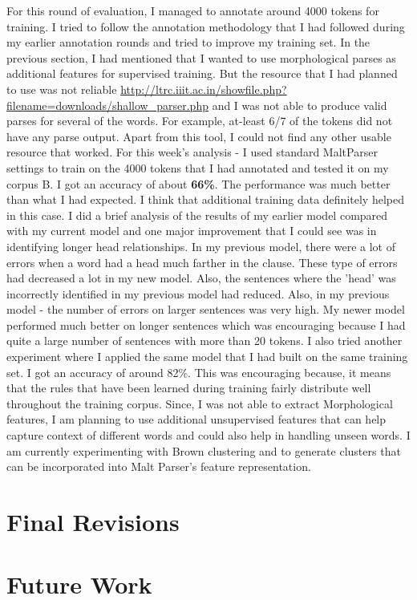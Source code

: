 \documentclass[11pt,letterpaper]{article}
\begin{document}
For this round of evaluation, I managed to annotate around 4000 tokens for training. I tried to follow the annotation methodology that I had followed during 
my earlier annotation rounds and tried to improve my training set. In the previous section, I had mentioned that I wanted to use morphological parses as additional features
for supervised training. But the resource that I had planned to use was not reliable \url{http://ltrc.iiit.ac.in/showfile.php?filename=downloads/shallow_parser.php} and I was not able to produce 
valid parses for several of the words. For example, at-least 6/7 of the tokens did not have any parse output. Apart from this tool, I could not find any other usable resource that worked.
For this week's analysis - I used standard MaltParser settings to train on the 4000 tokens that I had annotated and tested it on my corpus B. I got an
accuracy of about \textbf{66\%}. The performance was much better than what I had expected. I think that additional training data definitely helped in this case. I
did a brief analysis of the results of my earlier model compared with my current model and one major improvement that I could see was in identifying longer head relationships.
In my previous model, there were a lot of errors when a word had a head much farther in the clause. These type of errors had decreased a lot in my new model. 
Also, the sentences where the 'head' was incorrectly identified in my previous model had reduced. Also, in my previous model - the number of errors on larger sentences
was very high. My newer model performed much better on longer sentences which was encouraging because I had quite a large number of sentences with more than 20 tokens.
I also tried another experiment where I applied the same model that I had built on the same training set. I got an accuracy of around 82\%. This was encouraging because, it means that
the rules that have been learned during training fairly distribute well throughout the training corpus. Since, I was not able to extract Morphological features,
I am planning to use additional unsupervised features that can help capture context of different words and could also help in handling unseen words. I am currently
experimenting with Brown clustering and to generate clusters that can be incorporated into Malt Parser's feature representation. 

\section{Final Revisions}

\section{Future Work}




\label{lastpage}
\end{document}
